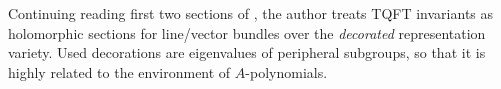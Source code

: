 \documentclass[11pt]{amsart}
\begin{document}
\par \vspace{1em}
Continuing reading first two sections of \cite{McPhailSnyder_Miller-2020-planar_diagrams}, the author treats TQFT invariants as holomorphic sections for line/vector bundles over the \textit{decorated} representation variety.
Used decorations are eigenvalues of peripheral subgroups, so that it is highly related to the environment of $A$-polynomials.




\end{document}
